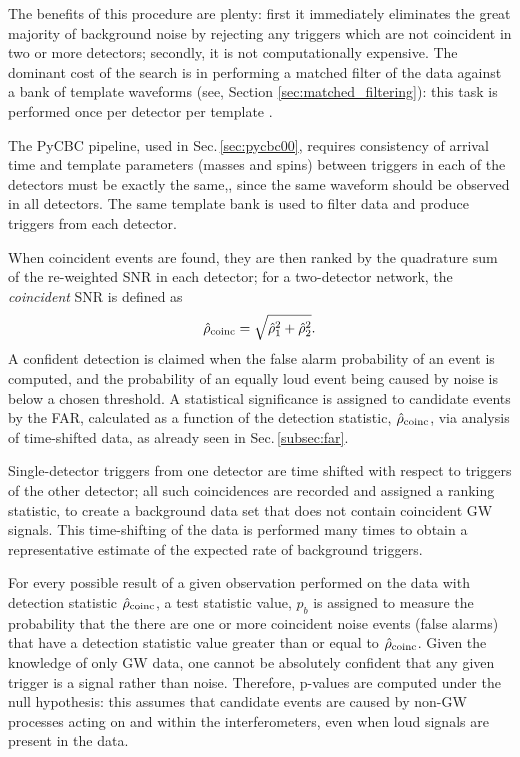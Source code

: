 \documentclass[binding=0.6cm, LaM]{sapthesis}
\begin{document}
        The benefits of this procedure are plenty: first it immediately eliminates the great majority of background noise 
	by rejecting any triggers which are not coincident in two or more detectors;
	secondly, it is not computationally expensive.
        The dominant cost of the search is in performing a matched filter 
        of the data against a bank of template waveforms (see, Section \ref{sec:matched_filtering}):
        this task is performed once per detector per template \cite{28, 45}.

	The {\ttfamily PyCBC} pipeline, used in Sec.\,\ref{sec:pycbc00}, 
	requires consistency of arrival time and template parameters (masses and spins) 
	between triggers in each of the detectors must be exactly the same,,
	since the same waveform should be observed in all detectors.
	The same template bank is used to filter data and produce triggers from each detector.

	When coincident events are found, they are then ranked by the quadrature sum of the re-weighted SNR in each detector;
	for a two-detector network, the \textit{coincident} SNR is defined as
        \begin{equation}
          \label{eq:rhocoincPyCBC}
          \hat{\rho}_{\rm coinc}  = \sqrt{\hat{\rho}^2_1 + \hat{\rho}^2_2}.
        \end{equation}
	A confident detection is claimed when the false alarm probability of an event is computed,
	and the probability of an equally loud event being caused by noise is below a chosen threshold. 
	A statistical significance is assigned to candidate events by the FAR,
	calculated as a function of the detection statistic, $\hat{\rho}_{\rm coinc}$,
	via analysis of time-shifted data, as already seen in Sec.\,\ref{subsec:far}.

	Single-detector triggers from one detector are time shifted with respect to triggers of the other detector;
	all such coincidences are recorded and assigned a ranking statistic, 
	to create a background data set that does not contain coincident GW signals.
	This time-shifting of the data is performed many times to obtain a representative estimate of the expected rate of background triggers.

	For every possible result of a given observation performed on the data with detection statistic $\hat{\rho}_{\rm coinc}$, 
	a test statistic value, $p_b$ is assigned to measure the probability that the 
	there are one or more coincident noise events (false alarms) that have
	a detection statistic value greater than or equal to $\hat{\rho}_{\rm coinc}$. 
	Given the knowledge of only GW data, one cannot be absolutely confident that 
	any given trigger is a signal rather than noise. 
	Therefore, p-values are computed under the null hypothesis: this assumes that candidate events 
	are caused by non-GW processes acting on and within the interferometers,
	even when loud signals are present in the data.
\end{document}
